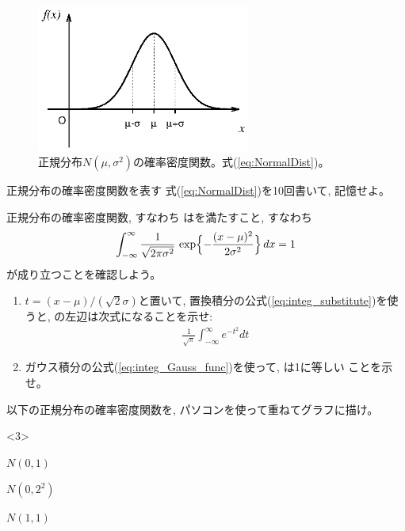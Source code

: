 \begin{figure}[h]
    \centering
    \includegraphics[width=7cm]{normal_dist0.eps}
    \caption{正規分布$N(\mu, \sigma^2)$の確率密度関数。式(\ref{eq:NormalDist})。}\label{fig:NormalDist}
\end{figure}
\mv

\begin{q}\label{q:stat_normal_remember} 正規分布の確率密度関数を表す
式(\ref{eq:NormalDist})を10回書いて, 記憶せよ。
\end{q}\mv

\begin{q}\label{q:stat_normal_remember_integ} 正規分布の確率密度関数, すなわち
はを満たすこと, すなわち
\begin{eqnarray}
\int_{-\infty}^{\infty}\frac{1}{\sqrt{2\pi \sigma^2}}\,\exp\Bigl\{-\frac{(x-\mu)^2}{2\sigma^2}\Bigr\}\,dx=1
\label{eq:NormalDist_integ}\end{eqnarray}
が成り立つことを確認しよう。
\begin{enumerate}
\item $t=(x-\mu)/(\sqrt{2}\sigma)$と置いて, 置換積分の公式(\ref{eq:integ_substitute})を使うと, 
の左辺は次式になることを示せ:
\begin{eqnarray}
\frac{1}{\sqrt{\pi}}\int_{-\infty}^{\infty}e^{-t^2}dt
\label{eq:NormalDist_integ1}\end{eqnarray}
\item ガウス積分の公式(\ref{eq:integ_Gauss_func})を使って, は1に等しい
ことを示せ。
\end{enumerate}
\end{q}\mv

\begin{q}\label{q:stat_fig_normal_dist} 以下の正規分布の確率密度関数を, パソコンを使って重ねてグラフに描け。
\begin{edaenumerate}<3>
\item $N(0, 1)$
\item $N(0, 2^2)$
\item $N(1, 1)$
\end {edaenumerate}
\end{q}\vspace{0.3cm}

